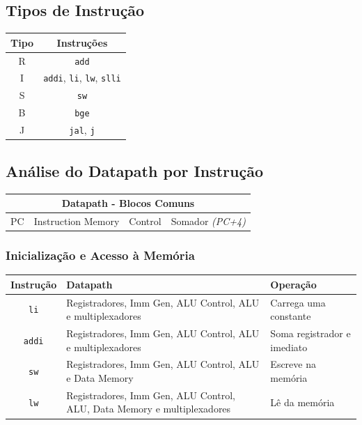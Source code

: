 \documentclass[12pt,a4paper,titlepage]{article}
\begin{document}
\subsection{Tipos de Instrução}
\begin{table}[h]
    \centering
    \begin{tabular}{|c|c|}
        \hline
        \textbf{Tipo} & \textbf{Instruções} \\ \hline\hline
        R & \texttt{add} \\ \hline
        I & \texttt{addi}, \texttt{li}, \texttt{lw}, \texttt{slli} \\ \hline
        S & \texttt{sw} \\ \hline
        B & \texttt{bge} \\ \hline
        J & \texttt{jal}, \texttt{j} \\ \hline
    \end{tabular}
\end{table}



\clearpage\subsection{Análise do Datapath por Instrução}
\begin{table}[h]
    \small
    \centering
    \begin{tabular}{|c|c|c|c|}
        \hline
        \multicolumn{4}{|c|}{\textbf{Datapath - Blocos Comuns}} \\ \hline\hline
        PC & Instruction Memory & Control & Somador \textit{(PC+4)} \\ \hline
    \end{tabular}
\end{table}

\subsubsection{Inicialização e Acesso à Memória}
\begin{table}[h]
    \small
    \centering
    \begin{tabularx}{\linewidth}{|c|X|X|}
        \hline
        \textbf{Instrução} & \textbf{Datapath} & \textbf{Operação} \\ \hline\hline
        \texttt{li} & Registradores, Imm Gen, ALU Control, ALU e multiplexadores & Carrega uma constante \\ \hline
        \texttt{addi} & Registradores, Imm Gen, ALU Control, ALU e multiplexadores & Soma registrador e imediato \\ \hline
        \texttt{sw} & Registradores, Imm Gen, ALU Control, ALU e Data Memory & Escreve na memória \\ \hline
        \texttt{lw} & Registradores, Imm Gen, ALU Control, ALU, Data Memory e multiplexadores & Lê da memória \\ \hline
    \end{tabularx}
\end{table}
\end{document}
